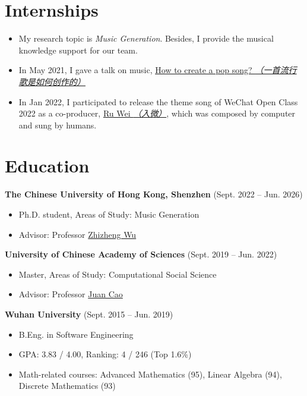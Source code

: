 \documentclass{resume}
\begin{document}
\section{Internships}
{\small {}
}
\begin{itemize}
  \item My research topic is \textit{Music Generation}. Besides, I provide the musical knowledge support for our
        team.
  \item In May 2021, I gave a talk on music,
        \href{https://www.zhangxueyao.com/data/wcpr-pop-music.pdf}{\underline{How to
            create a pop song? \textit{（一首流行歌是如何创作的）}}}
  \item In Jan 2022, I participated to release the theme song of WeChat Open Class 2022
        as a co-producer, \href{https://y.qq.com/n/ryqq/songDetail/000xeNJ53orPG2}{Ru
          Wei \textit{（入微）}}, which was composed by computer and sung by humans.
\end{itemize}

\section{Education}
{
  \small
  \textbf{The Chinese University of Hong Kong, Shenzhen} (Sept. 2022 -- Jun. 2026)
  \begin{itemize}
    \item Ph.D. student, Areas of Study: Music Generation
    \item Advisor: Professor
          \href{https://scholar.google.com/citations?user=K6zhweAAAAAJ&hl=en}{Zhizheng
            Wu}
  \end{itemize}
  \textbf{University of Chinese Academy of Sciences} (Sept. 2019 -- Jun. 2022)
  \small
  \begin{itemize}
    \item Master, Areas of Study: Computational Social Science
    \item Advisor: Professor
          \href{https://scholar.google.com/citations?user=fSBdNg0AAAAJ&hl=zh-CN}{Juan
            Cao}
  \end{itemize}
  \textbf{Wuhan University} (Sept. 2015 -- Jun. 2019)
  \begin{itemize}
    \item B.Eng. in Software Engineering
    \item GPA: 3.83 / 4.00, Ranking: 4 / 246 (Top 1.6\%)
    \item Math-related courses: Advanced Mathematics (95), Linear Algebra (94), Discrete
          Mathematics (93)
  \end{itemize}
}
\end{document}
